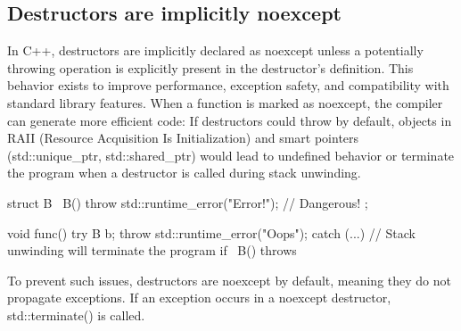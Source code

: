 \documentclass{report}
\begin{document}
    \subsection{Destructors are implicitly noexcept}
    \bigbreak \noindent 
    In C++, destructors are implicitly declared as noexcept unless a potentially throwing operation is explicitly present in the destructor's definition. This behavior exists to improve performance, exception safety, and compatibility with standard library features.
    \bigbreak \noindent 
    When a function is marked as noexcept, the compiler can generate more efficient code:
    \bigbreak \noindent 
    If destructors could throw by default, objects in RAII (Resource Acquisition Is Initialization) and smart pointers (std::unique\_ptr, std::shared\_ptr) would lead to undefined behavior or terminate the program when a destructor is called during stack unwinding.
    \bigbreak \noindent 
    \begin{cppcode}
        struct B {
            ~B() { throw std::runtime_error("Error!"); } // Dangerous!
        };

        void func() {
            try {
                B b;
                throw std::runtime_error("Oops");
            } catch (...) {
                // Stack unwinding will terminate the program if ~B() throws
            }
        }
    \end{cppcode}
    \bigbreak \noindent 
    To prevent such issues, destructors are noexcept by default, meaning they do not propagate exceptions. If an exception occurs in a noexcept destructor, std::terminate() is called.
    \bigbreak \noindent 

    \bigbreak \noindent 
\end{document}
